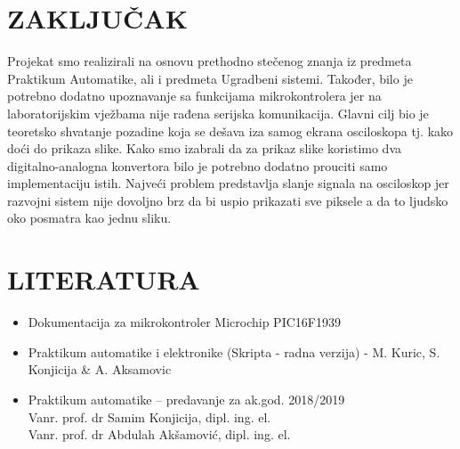 \documentclass[12pt]{article}
\begin{document}
\section{ZAKLJUČAK}
Projekat smo realizirali na osnovu prethodno stečenog znanja iz predmeta Praktikum
Automatike, ali i predmeta Ugradbeni sistemi. Također, bilo je potrebno dodatno upoznavanje sa
funkcijama mikrokontrolera jer na laboratorijskim vježbama nije rađena serijska komunikacija. Glavni cilj bio je
teoretsko shvatanje pozadine koja se dešava iza samog ekrana osciloskopa tj. kako doći do
prikaza slike. Kako smo izabrali da za prikaz slike koristimo dva digitalno-analogna konvertora bilo je potrebno dodatno prouciti samo implementaciju istih. Najveći problem predstavlja slanje signala na osciloskop jer razvojni sistem nije dovoljno brz da bi uspio prikazati sve piksele a da to ljudsko oko posmatra kao jednu sliku.
\pagebreak
\section{LITERATURA}

\begin{itemize}
  \item Dokumentacija za mikrokontroler Microchip PIC16F1939 
  \item Praktikum automatike i elektronike (Skripta - radna verzija) - M. Kuric, S. Konjicija & A. Aksamovic
\item Praktikum automatike – predavanje za ak.god. 2018/2019 \\
Vanr. prof. dr Samim Konjicija, dipl. ing. el.\\
Vanr. prof. dr Abdulah Akšamović, dipl. ing. el.


\end{itemize}
\pagebreak
{} 
{} 
 

\end{document}
